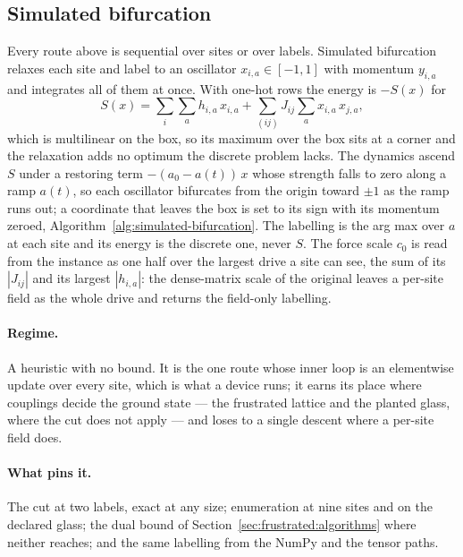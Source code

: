 \documentclass[11pt,a4paper]{article}
\begin{document}
\subsection{Simulated bifurcation}
\label{sec:potts-bifurcation}
Every route above is sequential over sites or over labels. Simulated
bifurcation \citep{goto2019, goto2021} relaxes each site and label to an
oscillator $x_{i,a} \in [-1, 1]$ with momentum $y_{i,a}$ and integrates all of
them at once. With one-hot rows the energy is $-S(x)$ for
\begin{equation}
  S(x) = \sum_i \sum_a h_{i,a}\, x_{i,a} + \sum_{(ij)} J_{ij} \sum_a x_{i,a}\, x_{j,a},
  \label{eq:bifurcation-score}
\end{equation}
which is multilinear on the box, so its maximum over the box sits at a corner
and the relaxation adds no optimum the discrete problem lacks. The dynamics
ascend $S$ under a restoring term $-(a_0 - a(t))\,x$ whose strength falls to
zero along a ramp $a(t)$, so each oscillator bifurcates from the origin toward
$\pm 1$ as the ramp runs out; a coordinate that leaves the box is set to its
sign with its momentum zeroed, Algorithm~\ref{alg:simulated-bifurcation}. The
labelling is the arg max over $a$ at each site and its energy is the
discrete one, never $S$. The force scale $c_0$ is read from the instance as
one half over the largest drive a site can see, the sum of its $|J_{ij}|$ and
its largest $|h_{i,a}|$: the dense-matrix scale of the original leaves a
per-site field as the whole drive and returns the field-only labelling.

\paragraph{Regime.}
A heuristic with no bound. It is the one route whose inner loop is an
elementwise update over every site, which is what a device runs; it earns its
place where couplings decide the ground state --- the frustrated lattice and
the planted glass, where the cut does not apply --- and loses to a single
descent where a per-site field does.

\paragraph{What pins it.}
The cut at two labels, exact at any size; enumeration at nine sites and on the
declared glass; the dual bound of Section~\ref{sec:frustrated:algorithms} where
neither reaches; and the same labelling from the NumPy and the tensor paths.
\end{document}
